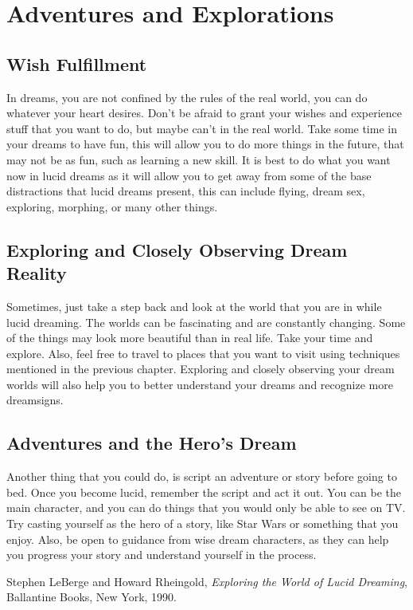 \documentclass{book}
\begin{document}
\chapter{Adventures and Explorations}

\section{Wish Fulfillment}
In dreams, you are not confined by the rules of the real world, you can do whatever your heart desires. Don't be afraid to grant your wishes and experience stuff that you want to do, but maybe can't in the real world. Take some time in your dreams to have fun, this will allow you to do more things in the future, that may not be as fun, such as learning a new skill. It is best to do what you want now in lucid dreams as it will allow you to get away from some of the base distractions that lucid dreams present, this can include flying, dream sex, exploring, morphing, or many other things.

\section{Exploring and Closely Observing Dream Reality}
Sometimes, just take a step back and look at the world that you are in while lucid dreaming. The worlds can be fascinating and are constantly changing. Some of the things may look more beautiful than in real life. Take your time and explore. Also, feel free to travel to places that you want to visit using techniques mentioned in the previous chapter. Exploring and closely observing your dream worlds will also help you to better understand your dreams and recognize more dreamsigns. 

\section{Adventures and the Hero's Dream}
Another thing that you could do, is script an adventure or story before going to bed. Once you become lucid, remember the script and act it out. You can be the main character, and you can do things that you would only be able to see on TV. Try casting yourself as the hero of a story, like Star Wars or something that you enjoy. Also, be open to guidance from wise dream characters, as they can help you progress your story and understand yourself in the process.

\begin{thebibliography}{9}

  Stephen LeBerge and Howard Rheingold,
  \textit{Exploring the World of Lucid Dreaming},
  Ballantine Books, New York,
  1990.

\end{thebibliography}
\end{document}
